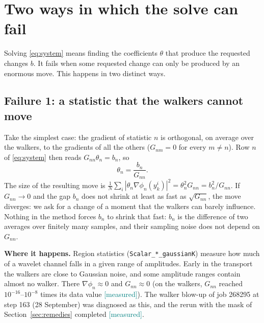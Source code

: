 \documentclass[11pt,a4paper]{article}
\newcommand{\code}[1]{\texttt{#1}}
\newcommand{\meas}{\textcolor{teal}{\textsf{[measured]}}}
\begin{document}
\section{Two ways in which the solve can fail}\label{sec:two}

Solving \eqref{eq:system} means finding the coefficients $\theta$ that produce the requested
changes $b$. It fails when some requested change can only be produced by an enormous move.
This happens in two distinct ways.

\subsection{Failure 1: a statistic that the walkers cannot move}\label{sec:fail1}
Take the simplest case: the gradient of statistic $n$ is orthogonal, on average over the walkers,
to the gradients of all the others ($G_{nm}=0$ for every $m\neq n$). Row $n$ of
\eqref{eq:system} then reads $G_{nn}\theta_n=b_n$, so
\[
  \theta_n=\frac{b_n}{G_{nn}} .
\]
The size of the resulting move is $\frac1N\sum_i|\theta_n\nabla\phi_n(y_k^i)|^2=\theta_n^2G_{nn}=b_n^2/G_{nn}$.
If $G_{nn}\to0$ and the gap $b_n$ does not shrink at least as fast as $\sqrt{G_{nn}}$, the move
diverges: we ask for a change of a moment that the walkers can barely influence. Nothing in the
method forces $b_n$ to shrink that fast: $b_n$ is the difference of two averages over finitely many
samples, and their sampling noise does not depend on $G_{nn}$.

\textbf{Where it happens.} Region statistics (\code{Scalar\_*\_gaussianK}) measure how much of a
wavelet channel falls in a given range of amplitudes. Early in the transport the walkers are close to
Gaussian noise, and some amplitude ranges contain almost no walker. There $\nabla\phi_n\approx0$
and $G_{nn}\approx0$ (on the walkers, $G_{nn}$ reached $10^{-16}$--$10^{-8}$ times its data value
\meas). The walker blow-up of job 268295 at step 163 (28 September) was diagnosed as this, and the
rerun with the mask of Section~\ref{sec:remedies} completed \meas.
\end{document}
